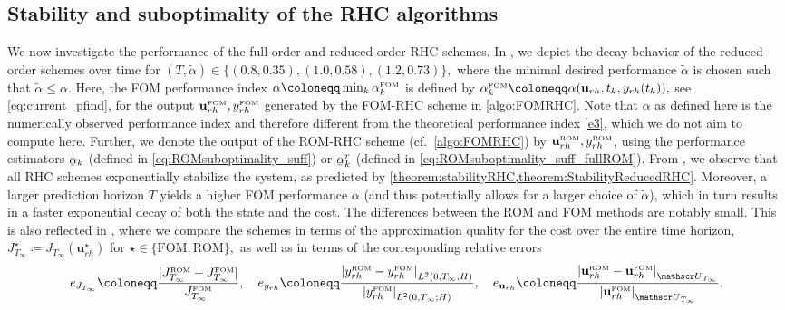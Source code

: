 \documentclass{m2an}
\newcommand{\bu}{\mathbf{u}}
\newcommand{\ubar}[1]{\underaccent{\bar}{#1}}
\newcommand{\mU}{{\mathscr U}}
\newcommand{\norm}[2]{\left|#1\right|_{#2}}
\begin{document}
\subsection{Stability and suboptimality of the RHC algorithms}\label{subsec:numstab}
%
We now investigate the performance of the full-order and reduced-order RHC schemes. 
In , we depict the decay behavior of the reduced-order schemes over time for $(T,\tilde{\alpha}) \in \{ (0.8,0.35), (1.0,0.58), (1.2,0.73) \},$
where the minimal desired performance $\tilde{\alpha}$ is chosen such that $\tilde{\alpha} \leq \alpha$. Here, the FOM performance index $\alpha \coloneqq \min_k \alpha_k^{\text{\tiny FOM}}$ is defined by $\alpha_k^{\text{\tiny FOM}} \coloneqq \alpha(\bu_{rh}, t_k, y_{rh}(t_k)),$ see \eqref{eq:current_pfind}, for the output $\bu_{rh}^{\text{\tiny FOM}}, y_{rh}^{\text{\tiny FOM}}$ generated by the FOM-RHC scheme in \cref{algo:FOMRHC}. {Note that $\alpha$ as defined here is the numerically observed performance index and therefore different from the theoretical performance index \eqref{e3}, which we do not aim to compute here.} Further, we denote the output of the ROM-RHC scheme (cf.~\cref{algo:FOMRHC}) by $\bu_{rh}^{\text{\tiny ROM}}, y_{rh}^{\text{\tiny ROM}}$, using the performance estimators $\ubar{\alpha}_k$ (defined in \eqref{eq:ROMsuboptimality_suff}) or $\ubar{\alpha}_k^r$ (defined in \eqref{eq:ROMsuboptimality_suff_fullROM}). From , we observe that all RHC schemes exponentially stabilize the system, as predicted by \cref{theorem:stabilityRHC,theorem:StabilityReducedRHC}. Moreover, a larger prediction horizon $T$ yields a higher FOM performance $\alpha$ (and thus potentially allows for a larger choice of $\tilde{\alpha}$), which in turn results in a faster exponential decay of both the state and the cost. The differences between the ROM and FOM methods are notably small. This is also reflected in , where we compare the schemes in terms of the approximation quality for the cost over the entire time horizon,
$ J^{\star}_{T_\infty} \coloneqq J_{T_\infty}(\bu^{\star}_{rh})$ for $ \star \in \{\text{FOM}, \text{ROM}\},$ as well as in terms of the corresponding relative errors
%
\begin{equation}\nonumber 
   e_{J_{T_\infty}} \coloneqq \frac{|J^{\text{\tiny ROM}}_{T_\infty}- J^{\text{\tiny FOM}}_{T_\infty}|}{J^{\text{\tiny FOM}}_{T_\infty}}, \quad e_{y_{rh}}\coloneqq  \frac{\norm{y_{rh}^{\text{\tiny ROM}}- y_{rh}^{\text{\tiny FOM}}}{L^2(0,T_\infty;H)}}{\norm{y_{rh}^{\text{\tiny FOM}}}{L^2(0,T_\infty;H)}}, \quad e_{\bu_{rh}}\coloneqq  \frac{\norm{\bu_{rh}^{\text{\tiny ROM}}- \bu_{rh}^{\text{\tiny FOM}}}{\mU_{T_\infty}}}{\norm{\bu_{rh}^{\text{\tiny FOM}}}{\mU_{T_\infty}}}.
\end{equation}
\end{document}
